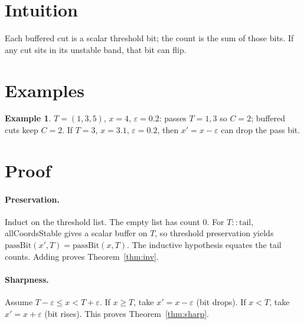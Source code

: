 \documentclass[12pt]{article}
\theoremstyle{plain}
\theoremstyle{definition}
\newtheorem{example}[theorem]{Example}
\theoremstyle{remark}
\begin{document}
\section{Intuition}
Each buffered cut is a scalar threshold bit; the count is the sum of those bits. If any cut sits in its unstable band, that bit can flip.

\section{Examples}
\begin{example}
$T=(1,3,5)$, $x=4$, $\varepsilon=0.2$: passes $T=1,3$ so $C=2$; buffered cuts keep $C=2$. If $T=3$, $x=3.1$, $\varepsilon=0.2$, then $x'=x-\varepsilon$ can drop the pass bit.
\end{example}

\section{Proof}
\paragraph{Preservation.}
Induct on the threshold list. The empty list has count $0$. For $T{::}\mathrm{tail}$, allCoordsStable gives a scalar buffer on $T$, so threshold preservation yields $\mathrm{passBit}(x',T)=\mathrm{passBit}(x,T)$. The inductive hypothesis equates the tail counts. Adding proves Theorem~\ref{thm:inv}.

\paragraph{Sharpness.}
Assume $T-\varepsilon\le x<T+\varepsilon$. If $x\ge T$, take $x'=x-\varepsilon$ (bit drops). If $x<T$, take $x'=x+\varepsilon$ (bit rises). This proves Theorem~\ref{thm:sharp}.
\end{document}
